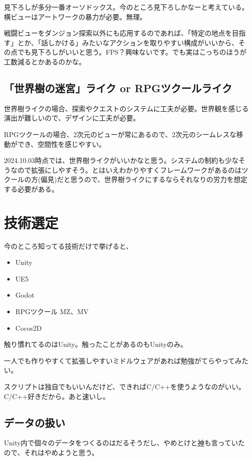 \documentclass{mynote}
\begin{document}
見下ろしが多分一番オーソドックス。今のところ見下ろしかなーと考えている。横ビューはアートワークの暴力が必要。無理。

戦闘ビューをダンジョン探索以外にも応用するのであれば、「特定の地点を目指す」とか、「話しかける」みたいなアクションを取りやすい構成がいいから、その点でも見下ろしがいいと思う。FPS？興味ないです。でも実はこっちのほうが工数減るとかあるのかな。

\subsection{「世界樹の迷宮」ライク or RPGツクールライク}

世界樹ライクの場合、探索やクエストのシステムに工夫が必要。世界観を感じる演出が難しいので、デザインに工夫が必要。

RPGツクールの場合、2次元のビューが常にあるので、2次元のシームレスな移動ができ、空間性を感じやすい。

2024.10.03時点では、世界樹ライクがいいかなと思う。システムの制約も少なそうなので拡張にしやすそう。とはいえわかりやすくフレームワークがあるのはツクールの方(偏見)だと思うので、世界樹ライクにするならそれなりの労力を想定する必要がある。

\section{技術選定}
今のところ知ってる技術だけで挙げると、
\begin{itemize}
  \item Unity
  \item UE5
  \item Godot
  \item RPGツクール MZ、MV
  \item Cocos2D
\end{itemize}

触り慣れてるのはUnity。触ったことがあるのもUnityのみ。

一人でも作りやすくて拡張しやすいミドルウェアがあれば勉強がてらやってみたい。

スクリプトは独自でもいいんだけど、できればC/C++を使うようなのがいい。C/C++好きだから。あと速いし。

\subsection{データの扱い}
Unity内で個々のデータをつくるのはだるそうだし、やめとけと\href{https://qiita.com/2dgames_jp/items/1730e7c4822091c3c320}{神}も言っていたので、それはやめようと思う。
\end{document}
